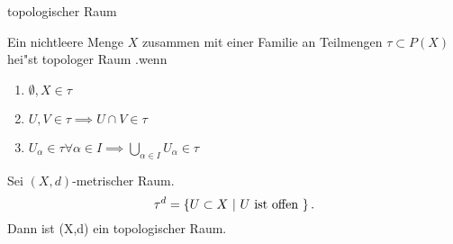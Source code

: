 \documentclass[class=article, crop=false]{standalone}
\begin{document}
\begin{zettel}{topologischer Raum}
\begin{flashcard}
    Ein nichtleere Menge $X$ zusammen mit einer Familie an Teilmengen $\tau \subset P(X)$  hei"st topologer Raum .wenn
    \begin{enumerate}
        \item $\emptyset, X \in  \tau $ 
        \item $U,V \in  \tau  \implies U \cap V \in  \tau $ 
        \item $U_\alpha \in \tau \forall  \alpha \in I \implies \bigcup_{\alpha \in  I} U_{\alpha} \in  \tau  $ 
    \end{enumerate}
\end{flashcard}

\begin{example}
    Sei $ (X,d) $-metrischer Raum.
    \[
        \tau^d = \set{U \subset X}{U \text{ ist offen } }
    .\]
    Dann ist (X,d) ein topologischer Raum.
\end{example}
\end{zettel}
\end{document}
